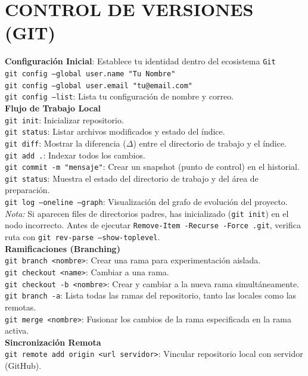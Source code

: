 \section{CONTROL DE VERSIONES (GIT)}
\textbf{Configuración Inicial}: Establece tu identidad dentro del ecosistema \texttt{Git}\\
\texttt{git config --global user.name "Tu Nombre"} \\
\texttt{git config --global user.email "tu@email.com"}\\
\texttt{git config --list}: Lista tu configuración de nombre y correo.
\\
\textbf{Flujo de Trabajo Local}\\
\texttt{git init}: Inicializar repositorio.\\
\texttt{git status}: Listar archivos modificados y estado del índice.\\
\texttt{git diff}: Mostrar la diferencia ($\Delta$) entre el directorio de trabajo y el índice.\\
\texttt{git add .}: Indexar todos los cambios.\\
\texttt{git commit -m "mensaje"}: Crear un snapshot (punto de control) en el historial.\\
\texttt{git status}: Muestra el estado del directorio de trabajo y del área de preparación. \\
\texttt{git log --oneline --graph}: Visualización del grafo de evolución del proyecto.
\\\textit{Nota:} Si aparecen files de directorios padres, has inicializado (\texttt{git init}) en el nodo incorrecto. Antes de ejecutar \texttt{Remove-Item -Recurse -Force .git}, verifica ruta con \texttt{git rev-parse --show-toplevel}.\\
\textbf{Ramificaciones (Branching)}\\
\texttt{git branch <nombre>}: Crear una rama para experimentación aislada.\\
\texttt{git checkout <name>}: Cambiar a una rama.
\\\texttt{git checkout -b <nombre>}: Crear y cambiar a la nueva rama simultáneamente.\\
\texttt{git branch -a}: Lista todas las ramas del repositorio, tanto las locales como las remotas.\\
\texttt{git merge <nombre>}: Fusionar los cambios de la rama especificada en la rama activa.\\
\textbf{Sincronización Remota}\\
\texttt{git remote add origin <url servidor>}: Vincular repositorio local con servidor (GitHub).\\
